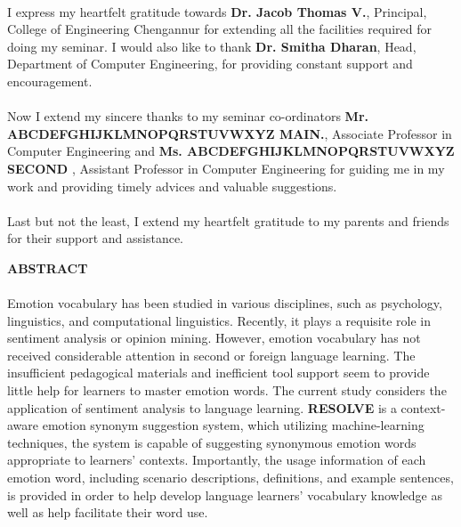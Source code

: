 \documentclass[a4paper,12pt,oneside]{article}
\begin{document}
\paragraph{}
I express my heartfelt gratitude towards \textbf{Dr. Jacob Thomas V.}, Principal, College
of Engineering Chengannur for extending all the facilities required for doing my seminar.
I would also like to thank \textbf{Dr. Smitha Dharan}, Head, Department of Computer
Engineering, for providing constant support and encouragement.
\paragraph{}
Now I extend my sincere thanks to my seminar co-ordinators \textbf{Mr. ABCDEFGHIJKLMNOPQRSTUVWXYZ MAIN.}, Associate
Professor in Computer Engineering and \textbf{Ms. ABCDEFGHIJKLMNOPQRSTUVWXYZ SECOND} , Assistant
Professor in Computer Engineering for guiding me in my work and providing timely
advices and valuable suggestions.
\paragraph{}
Last but not the least, I extend my heartfelt gratitude to my parents and friends for
their support and assistance.	

\newpage

\begin{center}
\large{\textbf{ABSTRACT}}
\end{center}
\vspace{6ex}
\paragraph{}

Emotion vocabulary has been studied in various disciplines, such as psychology, linguistics, and computational linguistics. Recently, it plays a requisite role in sentiment analysis or opinion mining. However, emotion vocabulary has not received considerable attention in second or foreign language learning. The insufficient pedagogical materials and inefficient tool support seem to provide little help for learners to master emotion words. The current study considers the application of sentiment analysis to language learning. \textbf{RESOLVE} is a context-aware emotion synonym suggestion system, which utilizing machine-learning techniques, the system is capable of suggesting synonymous emotion words appropriate to learners’ contexts. Importantly, the usage information of each emotion word, including scenario descriptions, definitions, and example sentences, is provided in order to help develop language learners’ vocabulary knowledge as well as help facilitate their word use. 
\end{document}
